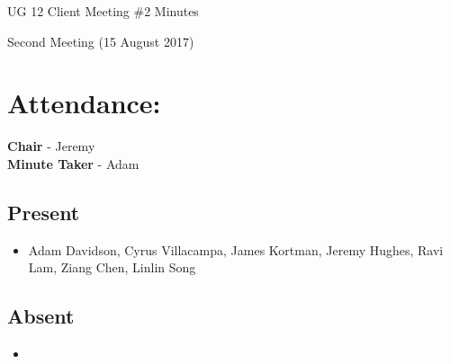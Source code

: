 \documentclass{article}
\begin{document}
\begin{adjustwidth}{2.5em}{0pt}
\begin{center}
\Large{UG 12 Client Meeting \#2  Minutes}\\
\end{center}
\end{adjustwidth}

Second Meeting (15 August 2017)
\section{Attendance:}
\textbf{Chair} - Jeremy\\
\textbf{Minute Taker} - Adam\\
\subsection*{Present}
\begin{itemize}
\item Adam Davidson, Cyrus Villacampa, James Kortman, Jeremy Hughes, Ravi Lam, Ziang Chen, Linlin Song
\end{itemize}
\subsection*{Absent}
\begin{itemize}
\item  
\end {itemize}
\end{document}
